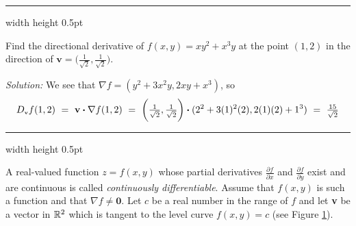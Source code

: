
\hrule width \textwidth height 0.5pt
\begin{exmp}
 Find the directional derivative of $f(x,y) = xy^2 + x^3 y$ at the point $(1,2)$ in the direction of
 $\textbf{v} = \biggl( \frac{1}{\sqrt{2}},\frac{1}{\sqrt{2}} \biggr)$.\smallskip
 \par\noindent\emph{Solution:} We see that $\nabla f = (y^2 + 3x^2 y, 2xy + x^3)$, so\index{$\nabla$}
 \begin{displaymath}
  D_{\scriptscriptstyle \textbf{v}}f(1,2) ~=~ \textbf{v} \bm{\cdot} \nabla f(1,2)
   ~=~ \biggl( \tfrac{1}{\sqrt{2}},\tfrac{1}{\sqrt{2}} \biggr) \bm{\cdot} (2^2 + 3(1)^2 (2),2(1)(2)+1^3)
   ~=~ \tfrac{15}{\sqrt{2}}
 \end{displaymath}
\end{exmp}
\hrule width \textwidth height 0.5pt
\medskip

A real-valued function $z=f(x,y)$ whose partial derivatives $\tfrac{\partial f}{\partial x}$ and
$\frac{\partial f}{\partial y}$ exist and are continuous is called \emph{continuously differentiable}.
Assume that $f(x,y)$ is such a function and that $\nabla f \ne \textbf{0}$. 
Let $c$ be a real number in the range of
$f$ and let \textbf{v} be a vector in $\mathbb{R}^{2}$ which is tangent to the
level curve $f(x,y) = c$ (see Figure \ref{fig:gradlevel}).
\begin{figure}[h]
 \begin{center}
 \end{center}
 \caption[]{}
 \label{fig:gradlevel}
\end{figure}

